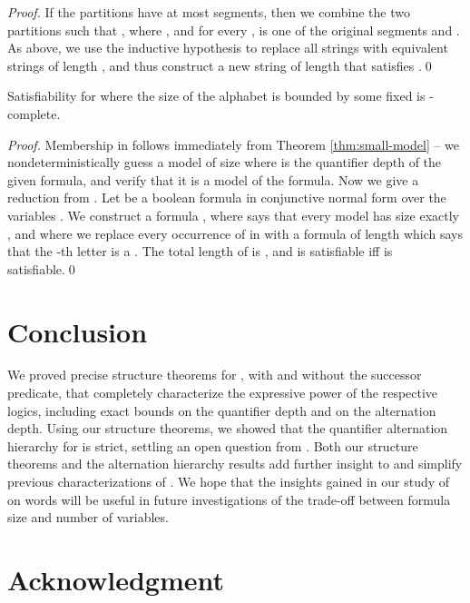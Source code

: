 \documentclass{LMCS}
\newcommand{\qedconf}{}
\renewcommand{\qedconf}{\qed}
\begin{document}
\begin{full}
\begin{proof}
  If the partitions have at most  segments, then we combine the
  two partitions such that , where , and for every ,  is one of the original
  segments  and . As above, we use the
  inductive hypothesis to replace all strings  with equivalent strings
  of length , and thus construct a new string of length 
  that satisfies .\qedconf
\end{proof}
\end{full}


\begin{thm}
  Satisfiability for  where the size of the alphabet is bounded
  by some fixed  is \NP-complete.
\end{thm}

\begin{proof}
  Membership in  follows immediately from Theorem \ref{thm:small-model}
  -- we nondeterministically guess a model of size  where  is the
  quantifier depth of the given formula, and verify that it is a model of
  the formula. Now we give a reduction from . Let  be a
  boolean formula in conjunctive normal form over the variables . We construct a  formula , where  says that every model has
  size exactly , and where we replace every occurrence of  in
   with a formula  of length  which says that the
  -th letter is a . The total length of  is , and  is satisfiable iff  is satisfiable.\qedconf
\end{proof}


\section{Conclusion}

We proved precise structure theorems for , with and without the
successor predicate, that completely characterize the expressive power of
the respective logics, including exact bounds on the quantifier depth and on
the alternation depth. Using our structure theorems, we showed that the
quantifier alternation hierarchy for  is strict, settling an open
question from \cite{EVW97,EVW02}. Both our structure theorems and the
alternation hierarchy results add further insight to and simplify previous
characterizations of . We hope that the insights gained in
our study of  on words will be useful in
future investigations of the trade-off between formula size and number of
variables.


\section*{Acknowledgment}
\end{document}
